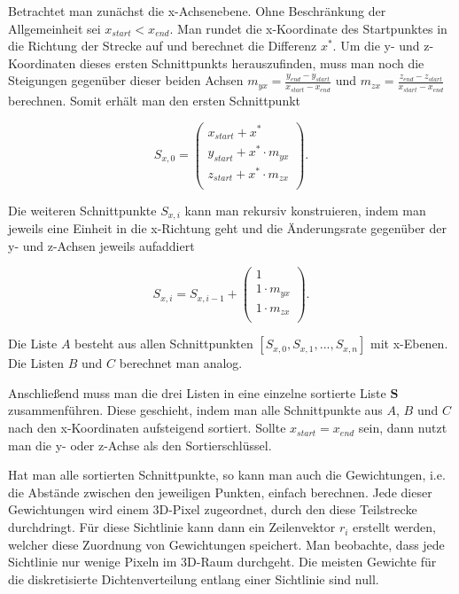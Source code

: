 Betrachtet man zunächst die x-Achsenebene. Ohne Beschränkung der Allgemeinheit sei $x_{start} < x_{end}$. Man rundet die x-Koordinate des Startpunktes in die Richtung der Strecke auf und berechnet die Differenz $x^{\ast}$. Um die y- und z-Koordinaten dieses ersten Schnittpunkts herauszufinden, muss man noch die Steigungen gegenüber dieser beiden Achsen $m_{yx} = \frac{y_{end} - y_{start}}{x_{start} - x_{end}}$ und $m_{zx} = \frac{z_{end} - z_{start}}{x_{start} - x_{end}}$ berechnen. Somit erhält man den ersten Schnittpunkt

\begin{equation}
  S_{x,0} = \begin{pmatrix}
    x_{start} + x^{\ast} \\
    y_{start} + x^{\ast} \cdot m_{yx} \\
    z_{start} + x^{\ast} \cdot m_{zx} \\
  \end{pmatrix}.
\end{equation}

Die weiteren Schnittpunkte $S_{x,i}$ kann man rekursiv konstruieren, indem man jeweils eine Einheit in die x-Richtung geht und die Änderungsrate gegenüber der y- und z-Achsen jeweils aufaddiert

\begin{equation}
  S_{x,i} = S_{x,i-1} + \begin{pmatrix}
    1 \\
    1 \cdot m_{yx} \\
    1 \cdot m_{zx} \\
  \end{pmatrix}.
\end{equation}

 Die Liste $A$ besteht aus allen Schnittpunkten $[S_{x,0}, S_{x,1}, ..., S_{x,n}]$ mit x-Ebenen. Die Listen $B$ und $C$ berechnet man analog.

Anschließend muss man die drei Listen in eine einzelne sortierte Liste $\mathbf{S}$ zusammenführen. Diese geschieht, indem man alle Schnittpunkte aus $A$, $B$ und $C$ nach den x-Koordinaten aufsteigend sortiert. Sollte $x_{start} = x_{end}$ sein, dann nutzt man die y- oder z-Achse als den Sortierschlüssel.

Hat man alle sortierten Schnittpunkte, so kann man auch die Gewichtungen, i.e. die Abstände zwischen den jeweiligen Punkten, einfach berechnen. Jede dieser Gewichtungen wird einem 3D-Pixel zugeordnet, durch den diese Teilstrecke durchdringt. Für diese Sichtlinie kann dann ein Zeilenvektor $r_i$ erstellt werden, welcher diese Zuordnung von Gewichtungen speichert. Man beobachte, dass jede Sichtlinie nur wenige Pixeln im 3D-Raum durchgeht. Die meisten Gewichte für die diskretisierte Dichtenverteilung entlang einer Sichtlinie sind null.


